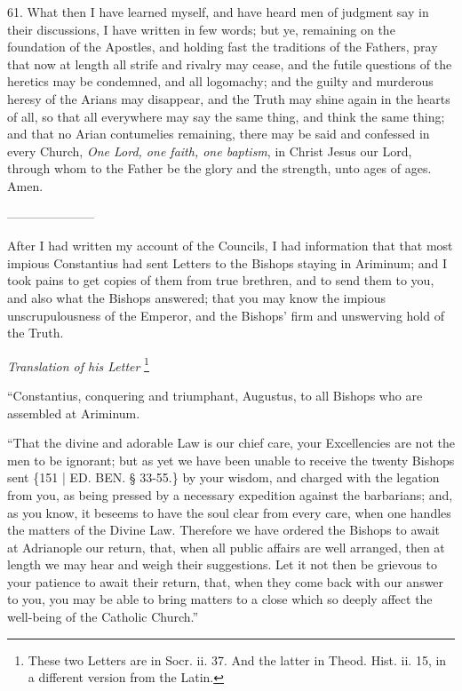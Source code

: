 61. What then I have learned
myself, and have heard men of judgment say in their discussions, I
have written in few words; but ye, remaining on the foundation of the
Apostles, and holding fast the traditions of the Fathers, pray that
now at length all strife and rivalry may cease, and the futile
questions of the heretics may be condemned, and all logomachy;
and the guilty and murderous heresy of the Arians may disappear, and
the Truth may shine again in the hearts of all, so that all everywhere
may say the same thing, and think the same thing; and that no Arian
contumelies remaining, there may be said and confessed in every
Church, \emph{One Lord, one faith, one baptism}, in Christ Jesus our
Lord, through whom to the Father be the glory and the strength, unto
ages of ages. Amen.

———————


After I had written my account
of the Councils, I had information that that most impious Constantius
had sent Letters to the Bishops staying in Ariminum; and I took pains
to get copies of them from true brethren, and to send them to you, and
also what the Bishops answered; that you may know the impious
unscrupulousness of the Emperor, and the Bishops' firm and unswerving
hold of the Truth.

\emph{Translation
of his Letter} \footnote{These two Letters are in Socr. ii. 37. And the latter in Theod. Hist.
ii. 15, in a different version from the Latin.}

``Constantius, conquering and
triumphant, Augustus, to all Bishops who are assembled at Ariminum.

``That the divine and adorable
Law is our chief care, your Excellencies are not the men to be
ignorant; but as yet we have been unable to receive the twenty Bishops
sent \{151 | ED.
BEN. § 33-55.\} by your wisdom, and charged
with the legation from you, as being pressed by a necessary expedition
against the barbarians; and, as you know, it beseems to have the soul
clear from every care, when one handles the matters of the Divine Law.
Therefore we have ordered the Bishops to await at Adrianople our
return, that, when all public affairs are well arranged, then at
length we may hear and weigh their suggestions. Let it not then be
grievous to your patience to await their return, that, when they come
back with our answer to you, you may be able to bring matters to a
close which so deeply affect the well-being of the Catholic Church.''

